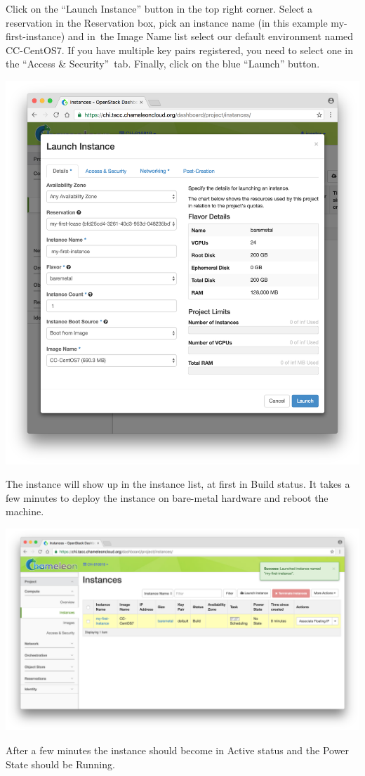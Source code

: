 Click on the ``Launch Instance'' button in the top right corner. Select
a reservation in the Reservation box, pick an instance name (in this
example my-first-instance) and in~the Image Name list select our default
environment named CC-CentOS7. If you have multiple key pairs registered,
you need to select one in the ``Access \& Security''~tab. Finally, click
on the blue ``Launch'' button.

\includegraphics[width=0.8\columnwidth]{images/chameleon/Screen-Shot-2016-10-26-at-14-41-08.png}

The instance will show up in the instance list, at first in Build
status. It takes a few minutes to deploy the instance on bare-metal
hardware and reboot the machine.

\includegraphics[width=0.8\columnwidth]{images/chameleon/Screen-Shot-2016-10-26-at-15-53-31.png}

After a few minutes the instance should become in Active status and the
Power State should be Running.


